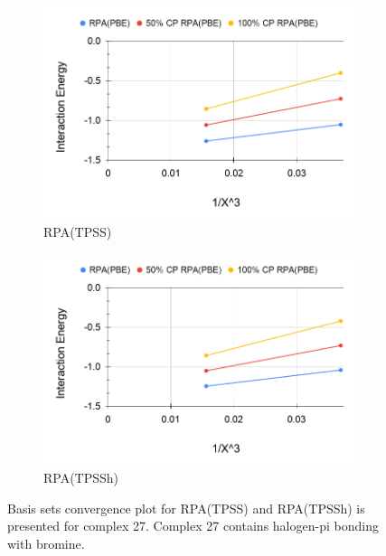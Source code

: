 \documentclass[11pt]{article}
\begin{document}
\begin{figure}[hbpt]
  \centering
  \begin{subfigure}{.5\textwidth}
    \centering
    \includegraphics[scale=0.3]{tpss-27.png}
    \caption{RPA(TPSS)}
    \label{fig:tpss_27}
  \end{subfigure}%
  \begin{subfigure}{.5\textwidth}
    \centering
    \includegraphics[scale=0.3]{tpssh-27.png}
    \caption{RPA(TPSSh)}
    \label{fig:tpssh_27}
  \end{subfigure}
  \caption{Basis sets convergence plot for RPA(TPSS) and RPA(TPSSh) is
    presented for complex 27. Complex 27 contains halogen-pi bonding
    with bromine.}
  \label{fig:complex_27}
\end{figure}
\end{document}
